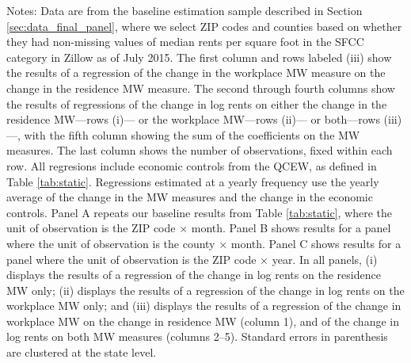 \begin{landscape}
\begin{table}[ht!]
    \begin{minipage}{.95\linewidth} \footnotesize
        \vspace{2mm}
        Notes:
        Data are from the baseline estimation sample described in Section 
        \ref{sec:data_final_panel}, where we select ZIP codes and counties based 
        on whether they had non-missing values of median rents per square foot 
        in the SFCC category in Zillow as of July 2015.
        The first column and rows labeled (iii) show the results of a regression 
        of the change in the workplace MW measure on the change in the 
        residence MW measure.
        The second through fourth columns show the results of regressions of the 
        change in log rents on either the change in the residence MW---rows (i)---
        or the workplace MW---rows (ii)--- 
        or both---rows (iii)---, with the fifth column showing the sum of the 
        coefficients on the MW measures.
        The last column shows the number of observations, fixed within each row.
        All regresions include economic controls from the QCEW, as defined in
        Table \ref{tab:static}.
        Regressions estimated at a yearly frequency use the yearly average of
        the change in the MW measures and the change in the economic controls.
        Panel A repeats our baseline results from Table \ref{tab:static}, where 
        the unit of observation is the ZIP code $\times$ month.
        Panel B shows results for a panel where the unit of observation is the 
        county $\times$ month.
        Panel C shows results for a panel where the unit of observation is the 
        ZIP code $\times$ year.
        In all panels,
        (i) displays the results of a regression of the change in log rents on 
        the residence MW only;
        (ii) displays the results of a regression of the change in log 
        rents on the workplace MW only; and
        (iii) displays the results of a regression of the change in workplace
        MW on the change in residence MW (column 1), and of the change in 
        log rents on both MW measures (columns 2--5).
        Standard errors in parenthesis are clustered at the state level.
    \end{minipage}
\end{table}
\end{landscape}
